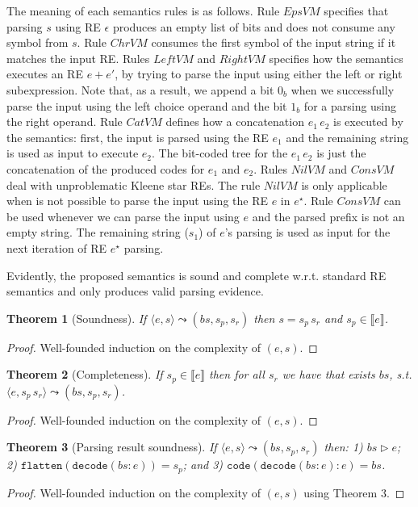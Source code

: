 \documentclass[oneside,12pt]{scrbook}
\newtheorem{Theorem}{Theorem}
\theoremstyle{definition}
\newcommand{\sembrackets}[1]{\ensuremath{\llbracket #1 \rrbracket}}
\newcommand{\flatten}{\ensuremath{\texttt{flatten}}}
\newcommand{\code}{\ensuremath{\texttt{code}}}
\newcommand{\decodee}{\ensuremath{\texttt{decode}}}
\theoremstyle{plain}
\theoremstyle{definition}
\begin{document}
The meaning of each semantics rules is as follows. Rule $EpsVM$ specifies that parsing $s$ using RE $\epsilon$ produces 
an empty list of bits and does not consume any symbol from $s$. Rule $ChrVM$ consumes the first symbol of the input string
if it matches the input RE.  Rules $LeftVM$ and 
$RightVM$ specifies how the semantics executes an RE $e + e'$, by trying to
parse the input using either the left or right subexpression. Note that, as a result, we append a bit $0_b$ when we successfully 
parse the input using the left choice operand and the bit $1_b$ for a parsing using the right operand. Rule $CatVM$ defines 
how a concatenation $e_1\,e_2$ is executed by the semantics: first, the input is parsed using the RE $e_1$ and the remaining 
string is used as input to execute $e_2$. The bit-coded tree for the $e_1\,e_2$ is just the concatenation of the produced 
codes for $e_1$ and $e_2$. Rules $NilVM$ and $ConsVM$ deal with unproblematic Kleene star REs. The rule $NilVM$ is only applicable when
is not possible to parse the input using the RE $e$ in $e^\star$. Rule $ConsVM$ can be used whenever we can parse the
input using $e$ and the parsed prefix is not an empty string. The remaining string ($s_1$) of $e$'s parsing is used as
input for the next iteration of RE $e^\star$ parsing. 

Evidently, the proposed semantics is sound and complete w.r.t. standard RE
semantics and only produces valid parsing evidence.

\begin{Theorem}[Soundness]
	If $\langle e, s \rangle \leadsto (bs,s_p,s_r)$ then $s = s_p\,s_r$ and $s_p\in\sembrackets{e}$.
\end{Theorem}
\begin{proof}
	Well-founded induction on the complexity of $(e,s)$.
\end{proof}

\begin{Theorem}[Completeness]
	If $s_p\in\sembrackets{e}$ then for all $s_r$ we have that exists $bs$, s.t. $\langle e, s_p\,s_r \rangle \leadsto (bs,s_p,s_r)$.
\end{Theorem}
\begin{proof}
	Well-founded induction on the complexity of $(e,s)$.
\end{proof}

\begin{Theorem}[Parsing result soundness]
	If $\langle e, s \rangle \leadsto (bs,s_p,s_r)$ then: 1) $bs \rhd e$; 2) $\flatten(\decodee(bs : e)) = s_p$; and 3)
	$\code(\decodee(bs : e) : e) = bs$. 
\end{Theorem}
\begin{proof}
	Well-founded induction on the complexity of $(e,s)$ using Theorem 3.
\end{proof}
\end{document}
